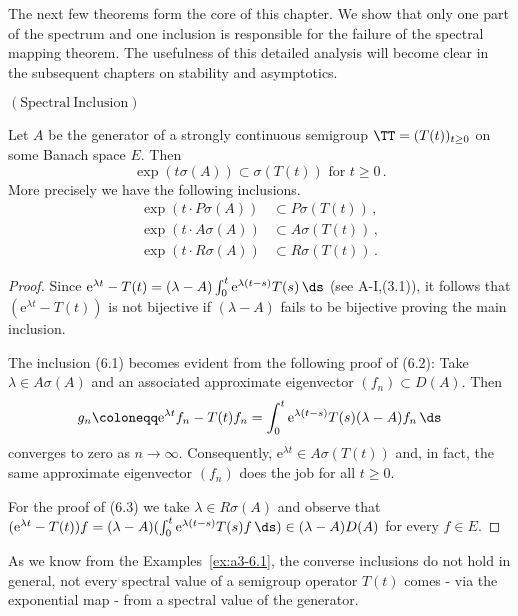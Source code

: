 The next few theorems form the core of this chapter. 
We show that only one part of the spectrum and one inclusion is responsible for the failure of the spectral mapping theorem.
The usefulness of this detailed analysis will become clear in the subsequent chapters on stability and asymptotics.
\begin{proposition}{$\mathrm{(Spectral\ Inclusion)}$}
	\label{prop:a3-6.2}
	
Let $A$ be the generator of a strongly continuous semigroup $\TT = (T(t))_{t \geq 0}$ on some Banach space $E$.
Then
\[
\exp(t\sigma(A)) \subset \sigma(T(t)) \text{ for } t \geq 0\,.
\]
More precisely we have the following inclusions.
\begin{align}
\exp(t \cdot P\sigma(A)) &\subset P\sigma(T(t)) \label{eq:a3-6.1}\,, \\
\exp(t \cdot A\sigma(A)) &\subset A\sigma(T(t)) \label{eq:a3-6.2}\,, \\
\exp(t \cdot R\sigma(A)) &\subset R\sigma(T(t)) \label{eq:a3-6.3}\,.
\end{align}
\end{proposition}
\begin{proof}
Since $\mathrm{e}^{\lambda t} - T(t) = (\lambda - A)\int_{0}^{t} \mathrm{e}^{\lambda(t-s)}T(s) \, \ds$ (see A-I,(3.1)), it follows that $(\mathrm{e}^{\lambda t} - T(t))$ is not bijective if $(\lambda - A)$ fails to be bijective proving the main inclusion.

The inclusion (6.1) becomes evident from the following proof of (6.2): Take $\lambda \in A\sigma(A)$ and an associated approximate eigenvector $(f_{n}) \subset D(A)$.
Then
\[
g_{n} \coloneqq \mathrm{e}^{\lambda t}f_{n} - T(t)f_{n} = \int_{0}^{t} \mathrm{e}^{\lambda(t-s)}T(s)(\lambda-A)f_{n} \, \ds
\]
converges to zero as $n \to \infty$.
Consequently, $\mathrm{e}^{\lambda t} \in A\sigma(T(t))$ and, in fact, the same approximate eigenvector $(f_{n})$ does the job for all $t \geq 0$.

For the proof of (6.3) we take $\lambda \in R\sigma(A)$ and observe that $(\mathrm{e}^{\lambda t} - T(t))f = (\lambda - A)(\int_{0}^{t} \mathrm{e}^{\lambda(t-s)}T(s)f \, \ds) \in (\lambda - A)D(A)$ for every $f \in E$.
\end{proof}
As we know from the Examples~\ref{ex:a3-6.1}, the converse inclusions do not hold in general, \ie not every spectral value of a semigroup operator $T(t)$ comes - via the exponential map - from a spectral value of the generator.
